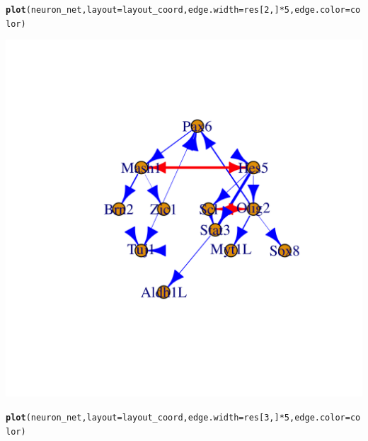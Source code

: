 \documentclass[10pt,oneside]{article}\usepackage[]{graphicx}\usepackage[]{color}
\makeatletter
\def\maxwidth{ %
  \ifdim\Gin@nat@width>\linewidth
    \linewidth
  \else
    \Gin@nat@width
  \fi
}
\newcommand{\hlnum}[1]{\textcolor[rgb]{0.686,0.059,0.569}{#1}}%
\newcommand{\hlopt}[1]{\textcolor[rgb]{0,0,0}{#1}}%
\newcommand{\hlstd}[1]{\textcolor[rgb]{0.345,0.345,0.345}{#1}}%
\newcommand{\hlkwc}[1]{\textcolor[rgb]{0.333,0.667,0.333}{#1}}%
\newcommand{\hlkwd}[1]{\textcolor[rgb]{0.737,0.353,0.396}{\textbf{#1}}}%
\newenvironment{kframe}{%
 \def\at@end@of@kframe{}%
 \ifinner\ifhmode%
  \def\at@end@of@kframe{\end{minipage}}%
  \begin{minipage}{\columnwidth}%
 \fi\fi%
 \def\FrameCommand##1{\hskip\@totalleftmargin \hskip-\fboxsep
 \colorbox{shadecolor}{##1}\hskip-\fboxsep
     \hskip-\linewidth \hskip-\@totalleftmargin \hskip\columnwidth}%
 \MakeFramed {\advance\hsize-\width
   \@totalleftmargin\z@ \linewidth\hsize
   \@setminipage}}%
 {\par\unskip\endMakeFramed%
 \at@end@of@kframe}
\newenvironment{knitrout}{}{} %
\makeatother
\begin{document}
\begin{knitrout}
{}


\begin{kframe}\begin{alltt}
\hlkwd{plot}\hlstd{(neuron_net,} \hlkwc{layout} \hlstd{= layout_coord,} \hlkwc{edge.width}\hlstd{=res[}\hlnum{2}\hlstd{, ]} \hlopt{*} \hlnum{5}\hlstd{,} \hlkwc{edge.color} \hlstd{= color)}
\end{alltt}
\end{kframe}

{\centering \includegraphics[width=\maxwidth]{figure/plot_temporal_rdi-6} 

}


\begin{kframe}\begin{alltt}
\hlkwd{plot}\hlstd{(neuron_net,} \hlkwc{layout} \hlstd{= layout_coord,} \hlkwc{edge.width}\hlstd{=res[}\hlnum{3}\hlstd{, ]} \hlopt{*} \hlnum{5}\hlstd{,} \hlkwc{edge.color} \hlstd{= color)}
\end{alltt}
\end{kframe}


\end{knitrout}
\end{document}
